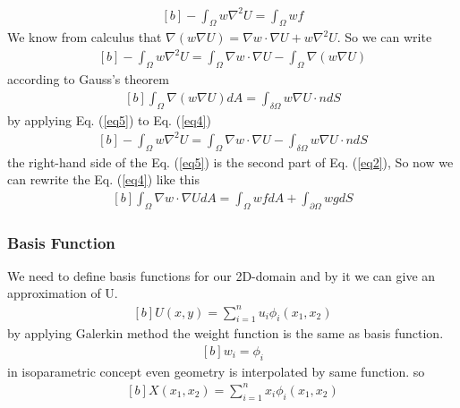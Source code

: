\documentclass[]{article}
\begin{document}
\begin{equation}\label{eq3}
	\begin{aligned}[b]
		-\int_\Omega w\nabla^2 U = \int_\Omega wf
	\end{aligned}
\end{equation}
We know from calculus that $\nabla(w\nabla U) = \nabla w \cdot \nabla U + w\nabla ^2 U$. So we can write
\begin{equation}\label{eq4}
	\begin{aligned}[b]
		-\int_\Omega w\nabla^2U =  \int_{\Omega} \nabla w \cdot \nabla U - \int_{\Omega} \nabla(w\nabla U)
	\end{aligned}
\end{equation}
according to Gauss’s theorem
\begin{equation}\label{eq5}
	\begin{aligned}[b]
		\int_\Omega \nabla(w\nabla U)dA = \int_{\delta\Omega} w \nabla U \cdot n dS
	\end{aligned}
\end{equation}
by applying Eq. (\ref{eq5}) to Eq. (\ref{eq4})
\begin{equation}\label{eq6}
	\begin{aligned}[b]
		-\int_\Omega w\nabla^2U = \int_{\Omega} \nabla w \cdot \nabla U - \int_{\delta\Omega} w \nabla U \cdot n dS
	\end{aligned}
\end{equation}
the right-hand side of the Eq. (\ref{eq5}) is the second part of Eq. (\ref{eq2}), So now we can rewrite the Eq. (\ref{eq4}) like this
\begin{equation}\label{eq7}
	\begin{aligned}[b]
		 \int_{\Omega} \nabla w \cdot \nabla U dA = \int_\Omega wf dA + \int_{\partial \Omega} wg dS
	\end{aligned}
\end{equation}
\subsubsection{Basis Function} \label{sec: Basis Func}
We need to define basis functions for our 2D-domain and by it we can give an approximation of U.
\begin{equation}\label{eq8}
	\begin{aligned}[b]
		U(x,y) =\sum_{i=1}^{n} u_{i}\phi_{i}(x_{1},x_{2})
	\end{aligned}
\end{equation}
by applying Galerkin method the weight function is the same as basis function.
\begin{equation}\label{eq9}
	\begin{aligned}[b]
		w_{i} =\phi_{i}
	\end{aligned}
\end{equation}
in isoparametric concept even geometry is interpolated by same function. so
\begin{equation}\label{eq10}
	\begin{aligned}[b]
		X(x_{1},x_{2}) =\sum_{i=1}^{n} x_{i}\phi_{i}(x_{1},x_{2})
	\end{aligned}
\end{equation}
\end{document}
